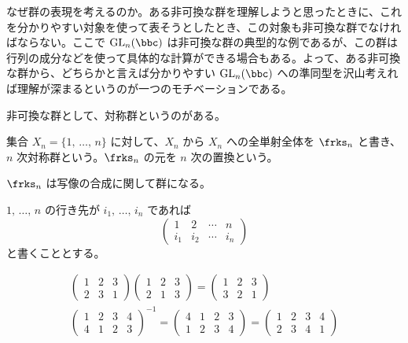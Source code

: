 \documentclass[a4paper]{ltjsarticle}
\begin{document}
なぜ群の表現を考えるのか。ある非可換な群を理解しようと思ったときに、これを分かりやすい対象を使って表そうとしたとき、この対象も非可換な群でなければならない。ここで $\GL_n(\bbc)$ は非可換な群の典型的な例であるが、この群は行列の成分などを使って具体的な計算ができる場合もある。よって、ある非可換な群から、どちらかと言えば分かりやすい $\GL_n(\bbc)$ への準同型を沢山考えれば理解が深まるというのが一つのモチベーションである。


非可換な群として、対称群というのがある。

\begin{dfn}[対称群]
  集合 $X_n = \{1,\,\dotsc,\,n\}$ に対して、$X_n$ から $X_n$ への全単射全体を $\frks_n$ と書き、$n$ 次対称群という。$\frks_n$ の元を $n$ 次の置換という。
\end{dfn}

\begin{rem}
  $\frks_n$ は写像の合成に関して群になる。
\end{rem}

$1,\,\dotsc,\,n$ の行き先が $i_1,\,\dotsc,\,i_n$ であれば
\begin{equation}
  \begin{pmatrix}
    1&2&\cdots&n\\
    i_1&i_2&\cdots&i_n
  \end{pmatrix}
\end{equation}
と書くこととする。

\begin{exm}
  \begin{gather}
    \begin{pmatrix}
      1&2&3\\
      2&3&1
    \end{pmatrix}\begin{pmatrix}
      1&2&3\\
      2&1&3
    \end{pmatrix} = \begin{pmatrix}
      1&2&3\\
      3&2&1
    \end{pmatrix}\\
    \begin{pmatrix}
      1&2&3&4\\
      4&1&2&3
    \end{pmatrix}^{-1} = \begin{pmatrix}
      4&1&2&3\\
      1&2&3&4
    \end{pmatrix} = \begin{pmatrix}
      1&2&3&4\\
      2&3&4&1
    \end{pmatrix}
  \end{gather}
\end{exm}
\end{document}
